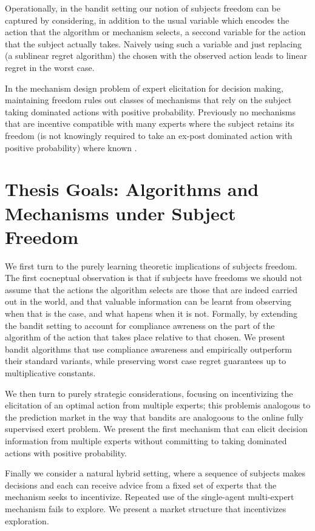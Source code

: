 Operationally, in the bandit setting our notion of subjects freedom can be captured by considering, in addition to the usual variable which encodes the action that the algorithm  or mechanism selects, a seccond variable for the action that the subject actually takes. Naively using such a variable and just replacing (a sublinear regret algorithm) the chosen with the observed action leads to linear regret in the worst case. 

In the mechanism design problem of expert elicitation for decision making, maintaining freedom rules out classes of mechanisms that rely on the subject taking dominated actions with positive probability. Previously no  mechanisms that are incentive compatible with many experts where the subject retains its freedom (is not knowingly required to take an ex-post dominated action with positive probability) where known \cite{chen2014eliciting}.

\section{Thesis Goals: Algorithms and Mechanisms under Subject Freedom}


We first turn to the purely learning theoretic implications of subjects freedom. The first cocneptual observation is that if subjects have freedoms we should not assume that the actions the algorithm selects are those that are indeed carried out in the world, and that valuable information can be learnt from observing when that is the case, and what hapens when it is not.
Formally, by extending the bandit setting to account for compliance awreness on the part of the algorithm of the action that takes place relative to that chosen. We present bandit algorithms that use compliance awareness and empirically  outperform their standard variants, while preserving worst case regret guarantees up to multiplicative constants. 

We then turn to purely strategic considerations, focusing on incentivizing the elicitation of an optimal action from multiple experts; this problemis analogous to the prediction market in the way that bandits are analogoous to the online fully supervised exert problem. 
We present the first mechanism that can elicit decision  information from multiple experts without committing to taking dominated actions with positive probability. 


Finally we consider a natural hybrid setting, where a sequence of subjects makes decisions and each can receive advice from a fixed set of experts that the mechanism seeks to incentivize. Repeated use of the single-agent multi-expert mechanism fails to explore. We present a market structure that incentivizes exploration.



